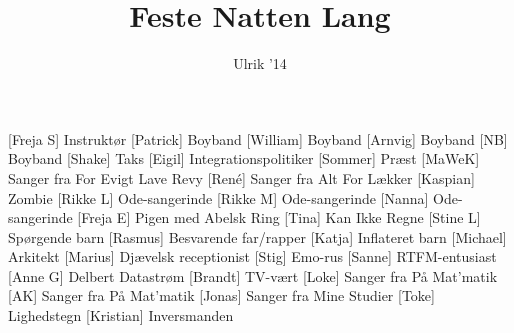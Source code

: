 \documentclass[a4paper,11pt]{article}
\title{Feste Natten Lang}
\author{Ulrik '14}
\begin{document}
\maketitle

\begin{roles}
[Freja S] Instruktør
[Patrick] Boyband
[William] Boyband
[Arnvig] Boyband
[NB] Boyband
[Shake] Taks
[Eigil] Integrationspolitiker
[Sommer] Præst
[MaWeK] Sanger fra For Evigt Lave Revy
[René] Sanger fra Alt For Lækker
[Kaspian] Zombie
[Rikke L] Ode-sangerinde
[Rikke M] Ode-sangerinde
[Nanna] Ode-sangerinde
[Freja E] Pigen med Abelsk Ring
[Tina] Kan Ikke Regne
[Stine L] Spørgende barn
[Rasmus] Besvarende far/rapper
[Katja] Inflateret barn
[Michael] Arkitekt
[Marius] Djævelsk receptionist
[Stig] Emo-rus
[Sanne] RTFM-entusiast
[Anne G] Delbert Datastrøm
[Brandt] TV-vært
[Loke] Sanger fra På Mat'matik
[AK] Sanger fra På Mat'matik
[Jonas] Sanger fra Mine Studier
\role{=}[Toke] Lighedstegn
[Kristian] Inversmanden
\end{roles}
\end{document}
